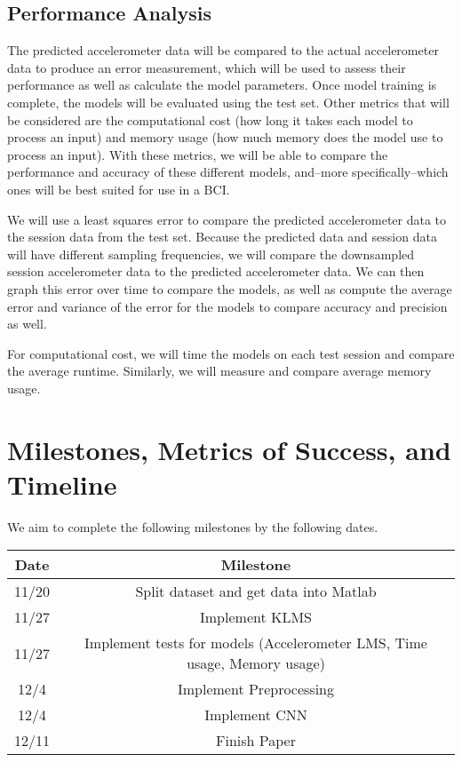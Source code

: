 \documentclass[12pt]{article}
\begin{document}
\subsection{Performance Analysis}

The predicted accelerometer data will be compared to the actual accelerometer data to produce an error measurement, which will be used to assess their performance as well as calculate the model parameters. Once model training is complete, the models will be evaluated using the test set. Other metrics that will be considered are the computational cost (how long it takes each model to process an input) and memory usage (how much memory does the model use to process an input). With these metrics, we will be able to compare the performance and accuracy of these different models, and--more specifically--which ones will be best suited for use in a BCI.

We will use a least squares error to compare the predicted accelerometer data to the session data from the test set. Because the predicted data and session data will have different sampling frequencies, we will compare the downsampled session accelerometer data to the predicted accelerometer data. We can then graph this error over time to compare the models, as well as compute the average error and variance of the error for the models to compare accuracy and precision as well.

For computational cost, we will time the models on each test session and compare the average runtime. Similarly, we will measure and compare average memory usage.

\section{Milestones, Metrics of Success, and Timeline}

We aim to complete the following milestones by the following dates.

\begin{center}
\begin{tabular}{ |c|c| } 
\hline
Date & Milestone\\ 
\hline
11/20 & Split dataset and get data into Matlab \\ 
11/27 & Implement KLMS\\
11/27 & Implement tests for models (Accelerometer LMS, Time usage, Memory usage)\\
12/4 & Implement Preprocessing\\
12/4 & Implement CNN\\
12/11 & Finish Paper\\
\hline
\end{tabular}
\end{center}
\end{document}

